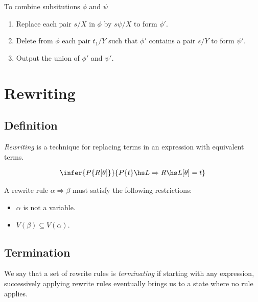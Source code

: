 \documentclass{article}
\begin{document}
To combine subsitutions $\phi$ and $\psi$
\begin{enumerate}
	\item Replace each pair $s/X$ in $\phi$ by $s\psi/X$ to form $\phi'$.
	\item Delete from $\phi$ each pair $t_1/Y$ such that $\phi'$ contains a pair $s/Y$ to form $\psi'$.
	\item Output the union of $\phi'$ and $\psi'$.
\end{enumerate}

\section{Rewriting}

\subsection{Definition}

\begin{definition}
	\emph{Rewriting} is a technique for replacing terms in an expression with equivalent terms.
\end{definition}

\begin{theorem}
	\begin{align*}
		\infer{P\{R[\theta]\}}{P\{t\}\hs L\Rightarrow R\hs L[\theta]=t}
	\end{align*}
\end{theorem}

\begin{definition}
	A rewrite rule $\alpha\Rightarrow\beta$ must satisfy the following restrictions:
	\begin{itemize}
		\item $\alpha$ is not a variable.
		\item $V(\beta)\subseteq V(\alpha)$.
	\end{itemize}
\end{definition}

\subsection{Termination}

\begin{definition}
	We say that a set of rewrite rules is \emph{terminating} if starting with any expression,
	successively applying rewrite rules eventually brings us to a state where no rule applies.
\end{definition}
\end{document}
